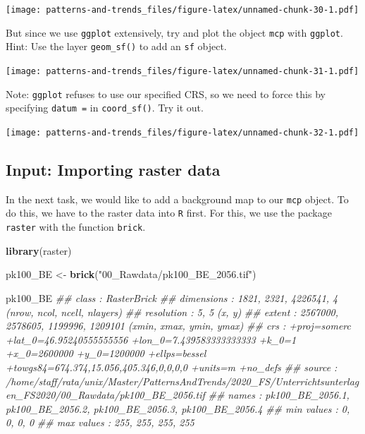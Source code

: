 \documentclass[]{book}
\newenvironment{Shaded}{\begin{snugshade}}{\end{snugshade}}
\newcommand{\CommentTok}[1]{\textcolor[rgb]{0.56,0.35,0.01}{\textit{#1}}}
\newcommand{\KeywordTok}[1]{\textcolor[rgb]{0.13,0.29,0.53}{\textbf{#1}}}
\newcommand{\NormalTok}[1]{#1}
\newcommand{\StringTok}[1]{\textcolor[rgb]{0.31,0.60,0.02}{#1}}
\begin{document}
\texttt{[image: patterns-and-trends\_files/figure-latex/unnamed-chunk-30-1.pdf]}

But since we use \texttt{ggplot} extensively, try and plot the object \texttt{mcp} with \texttt{ggplot}. Hint: Use the layer \texttt{geom\_sf()} to add an \texttt{sf} object.

\texttt{[image: patterns-and-trends\_files/figure-latex/unnamed-chunk-31-1.pdf]}

Note: \texttt{ggplot} refuses to use our specified CRS, so we need to force this by specifying \texttt{datum\ =} in \texttt{coord\_sf()}. Try it out.

\texttt{[image: patterns-and-trends\_files/figure-latex/unnamed-chunk-32-1.pdf]}

\hypertarget{input-importing-raster-data}{%
\subsection{Input: Importing raster data}\label{input-importing-raster-data}}

In the next task, we would like to add a background map to our \texttt{mcp} object. To do this, we have to the raster data into \texttt{R} first. For this, we use the package \texttt{raster} with the function \texttt{brick}.

\begin{Shaded}
\begin{Highlighting}[]

\KeywordTok{library}\NormalTok{(raster)}

\NormalTok{pk100_BE <-}\StringTok{ }\KeywordTok{brick}\NormalTok{(}\StringTok{"00_Rawdata/pk100_BE_2056.tif"}\NormalTok{)}

\NormalTok{pk100_BE}
\CommentTok{## class      : RasterBrick }
\CommentTok{## dimensions : 1821, 2321, 4226541, 4  (nrow, ncol, ncell, nlayers)}
\CommentTok{## resolution : 5, 5  (x, y)}
\CommentTok{## extent     : 2567000, 2578605, 1199996, 1209101  (xmin, xmax, ymin, ymax)}
\CommentTok{## crs        : +proj=somerc +lat_0=46.95240555555556 +lon_0=7.439583333333333 +k_0=1 +x_0=2600000 +y_0=1200000 +ellps=bessel +towgs84=674.374,15.056,405.346,0,0,0,0 +units=m +no_defs }
\CommentTok{## source     : /home/staff/rata/unix/Master/PatternsAndTrends/2020_FS/Unterrichtsunterlagen_FS2020/00_Rawdata/pk100_BE_2056.tif }
\CommentTok{## names      : pk100_BE_2056.1, pk100_BE_2056.2, pk100_BE_2056.3, pk100_BE_2056.4 }
\CommentTok{## min values :               0,               0,               0,               0 }
\CommentTok{## max values :             255,             255,             255,             255}
\end{Highlighting}
\end{Shaded}
\end{document}
